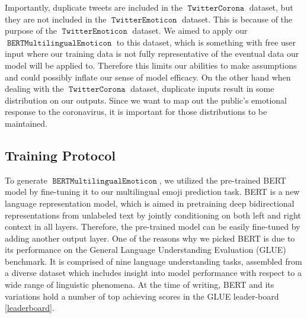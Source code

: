 \documentclass[11pt]{article}
\DeclareMathOperator{\model}{\texttt{BERTMultilingualEmoticon}}
\DeclareMathOperator{\emoticon}{\texttt{TwitterEmoticon}}
\DeclareMathOperator{\corona}{\texttt{TwitterCorona}}
\begin{document}
Importantly, duplicate tweets are included in the $\corona$ dataset,
but they are not included in the $\emoticon$ dataset.
This is because of the purpose of the $\emoticon$ dataset. 
We aimed to apply our $\model$ to this dataset,
which is something with free user input where our training data is not fully representative of the eventual data our model will be applied to.
Therefore this limits our abilities to make assumptions and could possibly inflate our sense of model efficacy.
On the other hand when dealing with the $\corona$ dataset,
duplicate inputs result in some distribution on our outputs.
Since we want to map out the public's emotional response to the coronavirus, it is important 
for those distributions to be maintained.


\subsection{Training Protocol}

To generate $\model$, we utilized the pre-trained BERT model \cite{bert} by fine-tuning it to our multilingual emoji prediction task. 
BERT is a new language representation model, which is aimed in pretraining deep bidirectional representations from unlabeled text by jointly conditioning on both left and right context in all layers.
Therefore, the pre-trained model can be easily fine-tuned by adding another output layer.
One of the reasons why we picked BERT is due to its performance on the General Language Understanding Evaluation (GLUE) \cite{} benchmark.
It is comprised of nine language understanding tasks, assembled from a diverse dataset which includes insight into model performance with respect to a wide range of linguistic phenomena.
At the time of writing, BERT and its variations hold a number of top achieving scores in the GLUE leader-board \ref{leaderboard}.   
\end{document}
